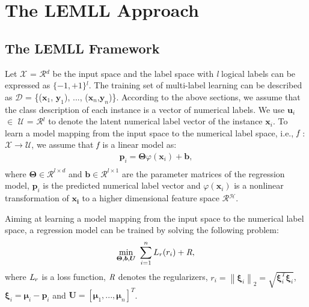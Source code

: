 \documentclass[conference]{IEEEtran}
\begin{document}
\section{The LEMLL Approach}
\subsection{The LEMLL Framework}
Let $\mathcal{X}$ = $\mathcal{R}$$^d$ be the input space and the label space with \emph{l} logical labels can be expressed as $\{-1, +1\}$$^l$. The training set of multi-label learning can be described as $\mathcal{D}$ = \{($\bm{x}_{1}$, $\bm{y}_{1}$), ..., ($\bm{x}_{n}$,$\bm{y}_{n}$)\}. According to the above sections, we assume that the class description of each instance is a vector of numerical labels. We use $\bm{u}_{i}$ $\in$ $\mathcal{U}$ = $\mathcal{R}$$^l$ to denote the latent numerical label vector of the instance $\bm{x}_{i}$. To learn a model mapping from the input space to the numerical label space, i.e., $\emph{f}$ : $\mathcal{X}$$\to$$\mathcal{U}$, we assume that $\emph{f}$ is a linear model as:
\begin{equation}
\begin{split}
\bm{p}_i = \bm{\Theta}\varphi(\bm{x}_i)+\bm{b},\\
\end{split}
\end{equation}
where $\bm{\Theta} \in \mathcal{R}^{l \times d}$ and $\bm{b} \in \mathcal{R}^{l\times 1}$ are the parameter matrices of the regression model, $\bm{p}_i$ is the predicted numerical label vector and $\varphi(\bm{x}_i)$ is a nonlinear transformation of $\bm{x_i}$ to a higher dimensional feature space $\mathcal{R}$$^\mathcal{H}$.

Aiming at learning a model mapping from the input space to the numerical label space, a regression model can be trained by solving the following problem:
\begin{equation}
\mathop {\min }\limits_{\bm{\Theta}, \bm{b}, \bm{U}} \ \sum_{i=1}^nL_r(r_i) +  \emph{R},\\
\end{equation}
where $\emph{L}_{r}$ is a loss function, $\emph{R}$ denotes the regularizers, $r_i=\left\lVert \bm{\xi}_i \right\rVert_2=\sqrt{\bm{\xi}_i^T\bm{\xi}_i}$, $\bm{\xi}_i=\bm{\mu}_i-\bm{p}_i$ and $\bm{U}=[\bm{\mu}_1, ..., \bm{\mu}_n ]^T$.
\end{document}
